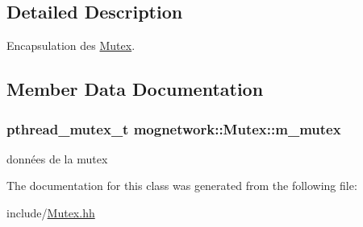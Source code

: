 \subsection{Detailed Description}
Encapsulation des \hyperlink{classmognetwork_1_1_mutex}{Mutex}. 

\subsection{Member Data Documentation}
\hypertarget{classmognetwork_1_1_mutex_a571d9d0b9b2be3da94192f34b6157ea9}{
\subsubsection[{m\-\_\-mutex}]{\setlength{\rightskip}{0pt plus 5cm}pthread\-\_\-mutex\-\_\-t mognetwork\-::\-Mutex\-::m\-\_\-mutex\hspace{0.3cm}{\ttfamily [protected]}}}\label{classmognetwork_1_1_mutex_a571d9d0b9b2be3da94192f34b6157ea9}
données de la mutex 

The documentation for this class was generated from the following file\-:\begin{DoxyCompactItemize}
\item 
include/\hyperlink{_mutex_8hh}{Mutex.\-hh}\end{DoxyCompactItemize}
